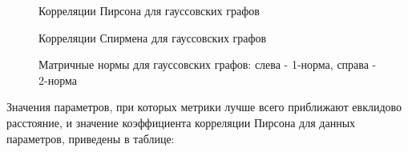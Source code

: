 \begin{figure}[h]
  \begin{minipage}[h]{0.49\linewidth}
  \end{minipage}
  \hfill
  \begin{minipage}[h]{0.49\linewidth}
  \end{minipage}

  \caption{Корреляции Пирсона для гауссовских графов}
  \label{img:wei_graphs}  
\end{figure}

\begin{figure}[h]
  \begin{minipage}[h]{0.49\linewidth}
  \end{minipage}
  \hfill
  \begin{minipage}[h]{0.49\linewidth}
  \end{minipage}

  \caption{Корреляции Спирмена для гауссовских графов}
  \label{img:wei_graphs_sp}  
\end{figure}


\begin{figure}[h]
  \begin{minipage}[h]{0.49\linewidth}
  \end{minipage}
  \hfill
  \begin{minipage}[h]{0.49\linewidth}
  \end{minipage}

  \caption{Матричные нормы для гауссовских графов: слева - 1-норма, справа - 2-норма}
  \label{img:wei_graphs_norm}  
\end{figure}



\newpage
 Значения параметров, при которых метрики лучше всего приближают евклидово расстояние, и значение коэффициента корреляции Пирсона для данных параметров, приведены в таблице:



